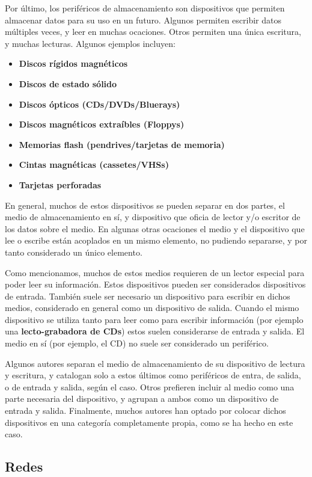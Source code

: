 Por último, los periféricos de almacenamiento son dispositivos que permiten
almacenar datos para su uso en un futuro. Algunos permiten escribir datos
múltiples veces, y leer en muchas ocaciones. Otros permiten una única escritura,
y muchas lecturas. Algunos ejemplos incluyen:
\begin{itemize}
    \item \textbf{Discos rígidos magnéticos}
    \item \textbf{Discos de estado sólido}
    \item \textbf{Discos ópticos (CDs/DVDs/Bluerays)}
    \item \textbf{Discos magnéticos extraíbles (Floppys)}
    \item \textbf{Memorias flash (pendrives/tarjetas de memoria)}
    \item \textbf{Cintas magnéticas (cassetes/VHSs)}
    \item \textbf{Tarjetas perforadas}
\end{itemize}

En general, muchos de estos dispositivos se pueden separar en dos partes, el
medio de almacenamiento en sí, y dispositivo que oficia de lector y/o escritor
de los datos sobre el medio. En algunas otras ocaciones el medio y el
dispositivo que lee o escribe están acoplados en un mismo elemento, no pudiendo
separarse, y por tanto considerado un único elemento.

Como mencionamos, muchos de estos medios requieren de un lector especial para
poder leer su información. Estos dispositivos pueden ser considerados
dispositivos de entrada. También suele ser necesario un dispositivo para
escribir en dichos medios, considerado en general como un dispositivo de salida.
Cuando el mismo dispositivo se utiliza tanto para leer como para escribir
información (por ejemplo una \textbf{lecto-grabadora de CDs}) estos suelen
considerarse de entrada y salida. El medio en sí (por ejemplo, el CD) no suele
ser considerado un periférico.

Algunos autores separan el medio de almacenamiento de su dispositivo de lectura
y escritura, y catalogan solo a estos últimos como periféricos de entra, de
salida, o de entrada y salida, según el caso. Otros prefieren incluir al medio
como una parte necesaria del dispositivo, y agrupan a ambos como un dispositivo
de entrada y salida. Finalmente, muchos autores han optado por colocar dichos
dispositivos en una categoría completamente propia, como se ha hecho en este
caso.

\subsection{Redes}
\label{chap:computadoras:subsec:redes}

